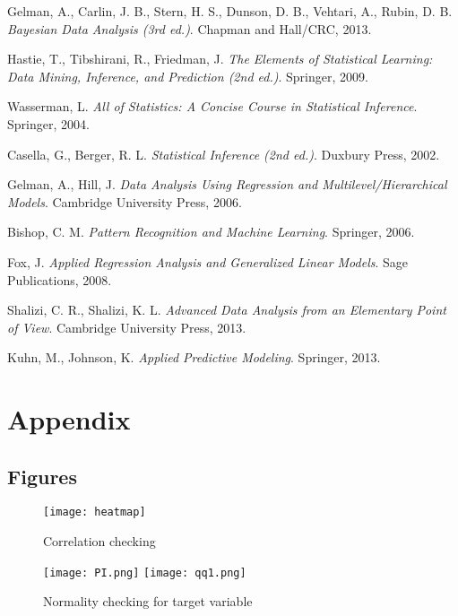 \documentclass[12pt]{article}
\begin{document}
		
	\begin{thebibliography}{9}
	Gelman, A., Carlin, J. B., Stern, H. S., Dunson, D. B., Vehtari, A., Rubin, D. B.
	\textit{Bayesian Data Analysis (3rd ed.)}.
	Chapman and Hall/CRC, 2013.
	
	Hastie, T., Tibshirani, R., Friedman, J.
	\textit{The Elements of Statistical Learning: Data Mining, Inference, and Prediction (2nd ed.)}.
	Springer, 2009.
	
	Wasserman, L.
	\textit{All of Statistics: A Concise Course in Statistical Inference}.
	Springer, 2004.
	
	Casella, G.,  Berger, R. L.
	\textit{Statistical Inference (2nd ed.)}.
	Duxbury Press, 2002.
	
	Gelman, A., Hill, J.
	\textit{Data Analysis Using Regression and Multilevel/Hierarchical Models}.
	Cambridge University Press, 2006.
	
	Bishop, C. M.
	\textit{Pattern Recognition and Machine Learning}.
	Springer, 2006.
	
	Fox, J.
	\textit{Applied Regression Analysis and Generalized Linear Models}.
	Sage Publications, 2008.
	
	Shalizi, C. R.,  Shalizi, K. L.
	\textit{Advanced Data Analysis from an Elementary Point of View}.
	Cambridge University Press, 2013.
	
	Kuhn, M., Johnson, K.
	\textit{Applied Predictive Modeling}.
	Springer, 2013.
	\end{thebibliography}
	
	\section*{Appendix}
	\subsection*{Figures}
		
	\begin{figure}[h]
		\centering
		\texttt{[image: heatmap]}
		\caption{Correlation checking}
		\label{fig:heatmap}
	\end{figure}
	
	\begin{figure}[h]
		\centering
		\texttt{[image: PI.png]}\hfill
		\texttt{[image: qq1.png]}
		\caption{Normality checking for target variable}
		\label{fig:QQplot}
	\end{figure}
	
\end{document}
